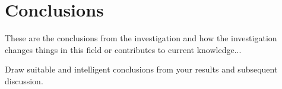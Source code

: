 \chapter{Conclusions}

These are the conclusions from the investigation and how the investigation changes things in this field or contributes to current knowledge...

Draw suitable and intelligent conclusions from your results and subsequent discussion.
